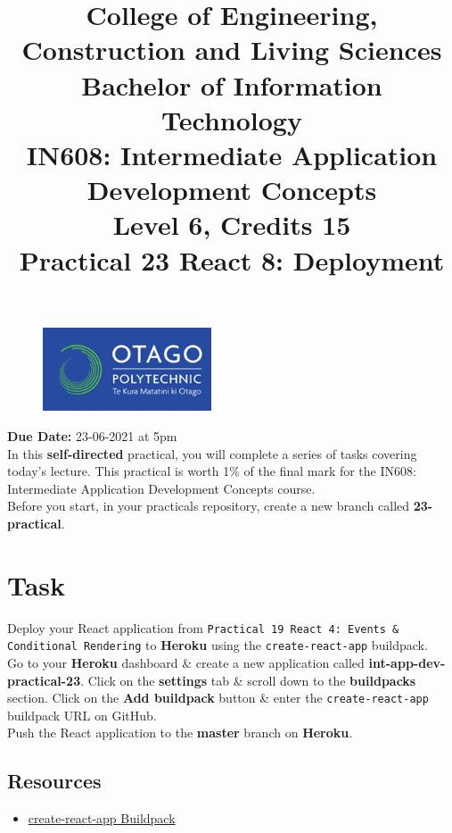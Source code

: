 \documentclass{article}
\author{}
\begin{document}
\begin{figure}
	\centering
	\includegraphics[width=50mm]{img/logo.png}
\end{figure}

\title{College of Engineering, Construction and Living Sciences\\Bachelor of Information Technology\\IN608: Intermediate Application Development Concepts\\Level 6, Credits 15\\\textbf{Practical 23 React 8: Deployment}} 
\date{}
\maketitle 

\textbf{Due Date:} 23-06-2021 at 5pm \\

In this \textbf{self-directed} practical, you will complete a series of tasks covering today's lecture. This practical is worth 1\% of the final mark for the IN608: Intermediate Application Development Concepts course. \\

Before you start, in your practicals repository, create a new branch called \textbf{23-practical}. 

\section*{Task} 
Deploy your React application from \texttt{Practical 19 React 4: Events \& Conditional Rendering} to \textbf{Heroku} using the \texttt{create-react-app} buildpack. \\

Go to your \textbf{Heroku} dashboard \& create a new application called \textbf{int-app-dev-practical-23}. Click on the \textbf{settings} tab \& scroll down to the \textbf{buildpacks} section. Click on the \textbf{Add buildpack} button \& enter the \texttt{create-react-app} buildpack URL on GitHub. \\

Push the React application to the \textbf{master} branch on \textbf{Heroku}. 

\subsection*{Resources} 
\begin{itemize}
  \item \href{https://github.com/mars/create-react-app-buildpack}{create-react-app Buildpack}
\end{itemize}
 
\end{document}
